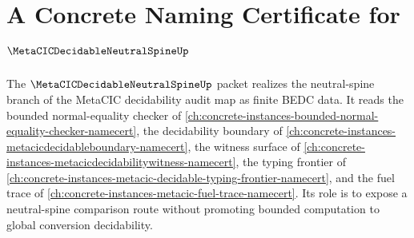 \chapter{A Concrete Naming Certificate for $\MetaCICDecidableNeutralSpineUp$}
\label{ch:concrete-instances-metacic-decidable-neutral-spine-namecert}

The $\MetaCICDecidableNeutralSpineUp$ packet realizes the neutral-spine branch of the MetaCIC decidability audit map as finite BEDC data. It reads the bounded normal-equality checker of \autoref{ch:concrete-instances-bounded-normal-equality-checker-namecert}, the decidability boundary of \autoref{ch:concrete-instances-metacicdecidableboundary-namecert}, the witness surface of \autoref{ch:concrete-instances-metacicdecidabilitywitness-namecert}, the typing frontier of \autoref{ch:concrete-instances-metacic-decidable-typing-frontier-namecert}, and the fuel trace of \autoref{ch:concrete-instances-metacic-fuel-trace-namecert}. Its role is to expose a neutral-spine comparison route without promoting bounded computation to global conversion decidability.

